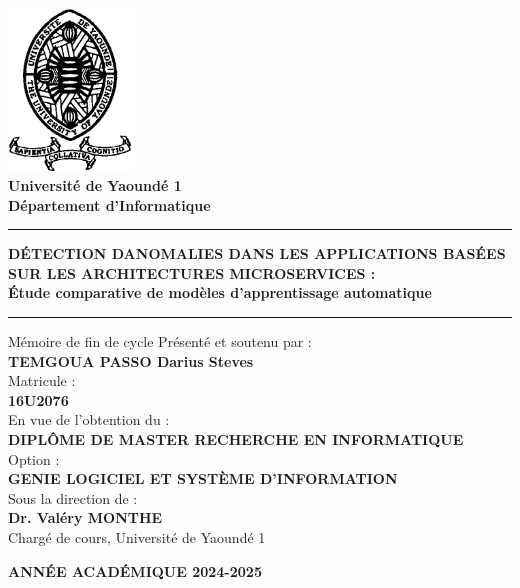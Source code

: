 \documentclass[a4paper,12pt]{report}
\begin{document}
\onehalfspacing
{}

\begin{titlepage}
    \begin{center}
        \includegraphics[width=0.25\textwidth]{images/logo_uy1.png}\\[1cm]

        \textbf{Université de Yaoundé 1}\\
        \textbf{Département d’Informatique}\\[0.5cm]

        \hrule height 4pt
        \vspace{0.5cm}
        {\bfseries \uppercase{Détection d\quotedblbase anomalies dans les applications basées sur les architectures microservices :}\\ 
        \Large Étude comparative de modèles d’apprentissage automatique}
        \vspace{0.5cm}
        \hrule height 4pt


        \begin{center}
        
        \large Mémoire de fin de cycle Présenté et soutenu par :\\
        \textbf{\large TEMGOUA PASSO Darius Steves}\\[0.2cm]
        Matricule :\\[0.2cm]
        \textbf{16U2076}\\[0.5cm]
        \large En vue de l'obtention du : \\[0.2cm]
        {\bfseries \uppercase{Diplôme de master recherche en informatique}}\\[0.2cm]
        \large Option : \\[0.2cm]
        {\bfseries \uppercase{genie logiciel et système d'information}}\\[0.2cm]
        \large Sous la direction de :\\[0.2cm]
        \textbf{Dr. Valéry MONTHE}\\[0.2cm]
        \large Chargé de cours, Université de Yaoundé 1\\[1cm]
        \end{center}
        \textbf{\uppercase{Année académique 2024-2025}}\\[0.3cm]
    \end{center}
\end{titlepage}
\end{document}
